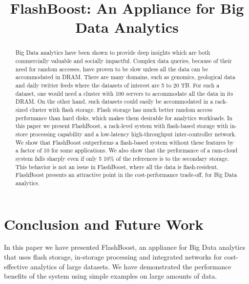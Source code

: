 \documentclass[pageno]{jpaper}
\begin{document}
\title{
FlashBoost: An Appliance for Big Data Analytics
}

\date{}
\maketitle


\begin{abstract}
Big Data analytics have been shown to provide deep insights which are both
commercially valuable and socially impactful. Complex data queries, because of
their need for random accesses, have proven to be slow unless all the data can
be accommodated in DRAM. There are many domains, such as genomics, geological
data and daily twitter feeds where the datasets of interest are 5 to 20 TB. For
such a dataset, one would need a cluster with 100 servers to accommodate all the
data in its DRAM. On the other hand, such datasets could easily be accommodated
in a rack-sized cluster with flash storage. Flash storage has much better random
access performance than hard disks, which makes them desirable for analytics
workloads. In this paper we present FlashBoost, a rack-level system with
flash-based storage with in-store processing capability and a low-latency
high-throughput inter-controller network.  We show that FlashBoost outperforms a
flash-based system without these features by a factor of 10 for some
applications. We also show that the performance of a ram-cloud system falls
sharply even if only 5 10\% of the references is to the secondary storage. This
behavior is not an issue in FlashBoost, where all the data is flash-resident.
FlashBoost presents an attractive point in the cost-performance trade-off, for
Big Data analytics. 
\end{abstract}



%









\section{Conclusion and Future Work}

In this paper we have presented FlashBoost, an appliance for Big Data analytics
that uses flash storage, in-storage processing and integrated networks for
cost-effective analytics of large datasets. We have demonstrated the performance
benefits of the system using simple examples on large amounts of data.
\end{document}
